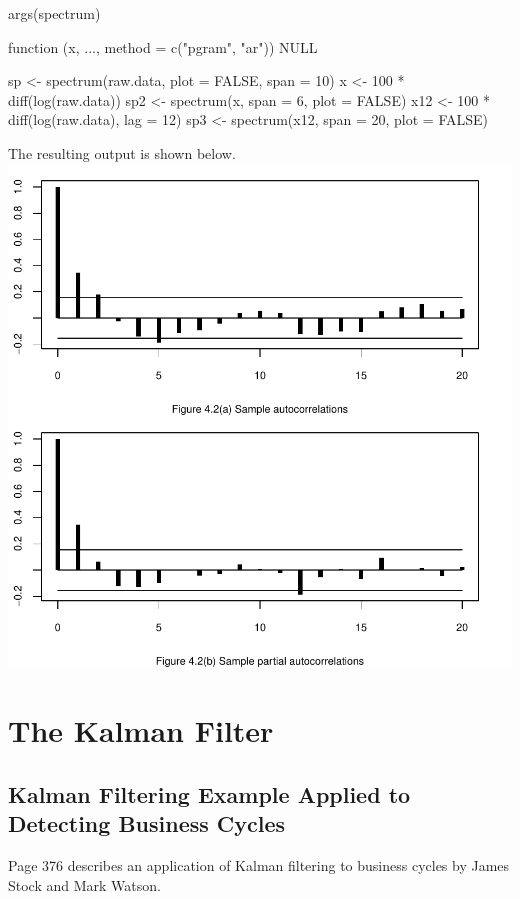 \documentclass[a4paper]{article}
\begin{document}
\begin{center}
\begin{Schunk}
\begin{Sinput}
 args(spectrum)
\end{Sinput}
\begin{Soutput}
function (x, ..., method = c("pgram", "ar")) 
NULL
\end{Soutput}
\end{Schunk}
\begin{Schunk}
\begin{Sinput}
 sp <- spectrum(raw.data, plot = FALSE, span = 10)
 x <- 100 * diff(log(raw.data))
 sp2 <- spectrum(x, span = 6, plot = FALSE)
 x12 <- 100 * diff(log(raw.data), lag = 12)
 sp3 <- spectrum(x12, span = 20, plot = FALSE)
\end{Sinput}
\end{Schunk}
The resulting output is shown below.
\includegraphics{Companion-034}
\end{center}

\section{The Kalman Filter}
\subsection{Kalman Filtering Example Applied to Detecting Business Cycles}
Page 376 describes an application of Kalman filtering to business cycles by James Stock and Mark Watson.
\end{document}

